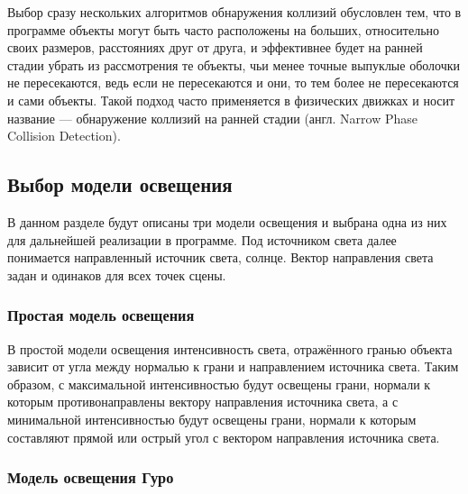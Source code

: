 Выбор сразу нескольких алгоритмов обнаружения коллизий обусловлен тем, что в программе объекты могут быть часто расположены на больших, относительно своих размеров, расстояниях друг от друга, и эффективнее будет на ранней стадии убрать из рассмотрения те объекты, чьи менее точные выпуклые оболочки не пересекаются, ведь если не пересекаются и они, то тем более не пересекаются и сами объекты.
Такой подход часто применяется в физических движках и носит название --- обнаружение коллизий на ранней стадии (англ. Narrow Phase Collision Detection). %




\subsection{Выбор модели освещения}

В данном разделе будут описаны три модели освещения и выбрана одна из них для дальнейшей реализации в программе.
Под источником света далее понимается направленный источник света, солнце.
Вектор направления света задан и одинаков для всех точек сцены.

\subsubsection{Простая модель освещения}

В простой модели освещения интенсивность света, отражённого гранью объекта зависит от угла между нормалью к грани и направлением источника света.
Таким образом, с максимальной интенсивностью будут освещены грани, нормали к которым противонаправлены вектору направления источника света, а с минимальной интенсивностью будут освещены грани, нормали к которым составляют прямой или острый угол с вектором направления источника света.

\subsubsection{Модель освещения Гуро}

